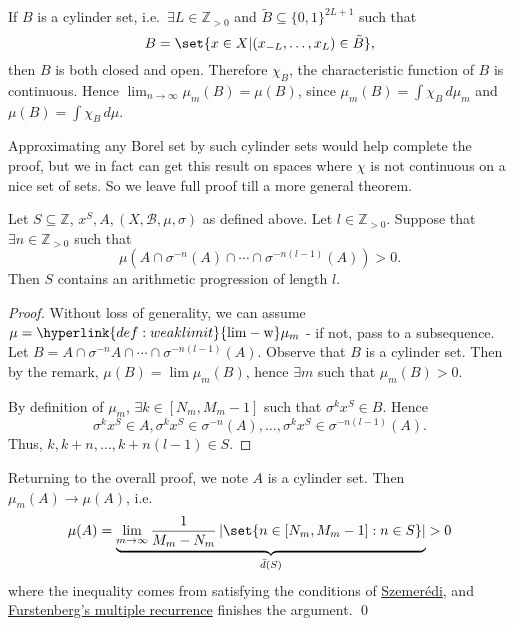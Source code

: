 \documentclass{article}
\DeclareMathOperator*{\limw}{lim-w}
\begin{document}
\begin{remark}
  If $B$ is a cylinder set, i.e.\ $\exists L \in \mathbb{Z}_{>0}$ and $\tilde{B} \subseteq \{0,1\}^{2L+1}$ such that
  \begin{equation*}
    B = \set{x \in X | (x_{-L}, \dotsc, x_L) \in \tilde{B}},
  \end{equation*}
  then $B$ is both closed and open.
  Therefore $\chi_B$, the characteristic function of $B$ is continuous.
  Hence $\lim_{n \to \infty} \mu_m(B) = \mu(B)$, since $\mu_m(B) = \int \chi_B \, d \mu_m$ and $\mu(B) = \int \chi_B \, d \mu$.

  Approximating any Borel set by such cylinder sets would help complete the proof, but we in fact can get this result on spaces where $\chi$ is not continuous on a nice set of sets.
  So we leave full proof till a more general theorem.
\end{remark}

\begin{prop}
  Let $S \subseteq \mathbb{Z}$, $x^S, A, (X, \mathcal{B}, \mu, \sigma)$ as defined above.
  Let $l \in \mathbb{Z}_{> 0}$.
  Suppose that $\exists n \in \mathbb{Z}_{>0}$ such that
  \begin{equation*}
    \mu\left(A \cap \sigma^{-n}(A) \cap \dotsb \cap \sigma^{-n(l-1)}(A)\right) > 0.
  \end{equation*}
  Then $S$ contains an arithmetic progression of length $l$.
\end{prop}
\begin{proof}
  Without loss of generality, we can assume $\mu = \hyperlink{def:weaklimit}{\limw} \mu_m$ - if not, pass to a subsequence.
  Let $B = A \cap \sigma^{-n} A \cap \dotsb \cap \sigma^{-n (l-1)} (A).$
  Observe that $B$ is a cylinder set.
  Then by the remark, $\mu(B) = \lim \mu_m(B)$, hence $\exists m$ such that $\mu_m(B) > 0$.

  By definition of $\mu_m$, $\exists k \in [N_m, M_m - 1]$ such that $\sigma^k x^S \in B$.
  Hence
  \begin{equation*}\sigma^k x^S \in A, \sigma^k x^S \in \sigma^{-n}(A), \dotsc, \sigma^k x^S \in \sigma^{-n(l-1)}(A).\end{equation*}
  Thus, $k, k+n, \dotsc, k + n(l-1) \in S$.
\end{proof}
Returning to the overall proof, we note $A$ is a cylinder set.
Then $ \mu_m(A)\to\mu(A) $, i.e.\
\begin{equation*} \mu(A) = \underbrace{\lim_{m\to\infty}\frac{1}{M_m-N_m}\left|\set{n\in[N_m,M_m-1]: n\in S}\right|}_{\bar{d}(S)} > 0 \end{equation*}
where the inequality comes from satisfying the conditions of \hyperlink{thm:sze}{Szemer\'edi}, and \hyperlink{thm:furs}{Furstenberg's multiple recurrence} finishes the argument. \qed
\end{document}
